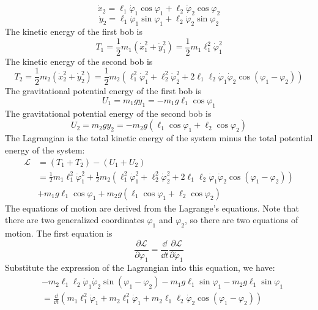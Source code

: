 \documentclass[11pt]{article}
\def\LL{{\mathcal L}}
\begin{document}
\begin{equation*}
  \dot{x}_2 = \ell_1 \dot{\varphi}_1 \cos\varphi_1 + \ell_2 \dot{\varphi}_2 \cos\varphi_2
\end{equation*}
\begin{equation*}
  \dot{y}_2 = \ell_1 \dot{\varphi}_1 \sin \varphi_1 + \ell_2 \dot{\varphi}_2 \sin \varphi_2
\end{equation*}
The kinetic energy of the first bob is
\begin{equation}
  T_1 = \frac{1}{2}m_1 (\dot{x}_1^2 + \dot{y}_1^2) = \frac{1}{2}m_1 \ell_1^2  \dot{\varphi}_1^2
\end{equation}
The kinetic energy of the second bob is
\begin{equation}
  T_2 = \frac{1}{2}m_2 (\dot{x}_2^2 + \dot{y}_2^2) = \frac{1}{2}m_2 (\ell_1^2  \dot{\varphi}_1^2 + \ell_2^2  \dot{\varphi}_2^2 +
  2\ell_1\ell_2\dot{\varphi}_1 \dot{\varphi}_2 \cos(\varphi_1 - \varphi_2))
\end{equation}
The gravitational potential energy of the first bob is
\begin{equation}
  U_1 = m_1gy_1 = -m_1g \ell_1 \cos \varphi_1
\end{equation}
The gravitational potential energy of the second bob is
\begin{equation}
  U_2 = m_2gy_2 = -m_2g (\ell_1\cos\varphi_1 + \ell_2 \cos\varphi_2)
\end{equation}
The Lagrangian is the total kinetic energy of the system minus the total potential energy of the system:
\begin{align*}
  \LL
  &= (T_1 + T_2) - (U_1 + U_2) \\
  &= \frac{1}{2}m_1 \ell_1^2  \dot{\varphi}_1^2 +
  \frac{1}{2}m_2 (\ell_1^2  \dot{\varphi}_1^2 + \ell_2^2  \dot{\varphi}_2^2 +
  2\ell_1\ell_2\dot{\varphi}_1 \dot{\varphi}_2 \cos(\varphi_1 - \varphi_2))\\
  &+
  m_1g \ell_1 \cos \varphi_1
  +
  m_2g (\ell_1\cos\varphi_1 + \ell_2 \cos\varphi_2)
\end{align*}
The equations of motion are derived from the Lagrange's equations. Note that there are two generalized coordinates
\(\varphi_1\) and \(\varphi_2\), so there are two equations of motion. The first equation is
\begin{equation*}
  \frac{\partial \LL}{\partial \varphi_1} = \frac{\dd}{\dd t} \frac{\partial \LL}{\partial \dot{\varphi}_1}
\end{equation*}
Substitute the expression of the Lagrangian into this equation, we have:
\begin{align*}
  &-m_2\ell_1\ell_2\dot{\varphi}_1 \dot{\varphi}_2 \sin(\varphi_1 - \varphi_2) - m_1g\ell_1 \sin\varphi_1 - m_2g\ell_1 \sin\varphi_1\\
  &= \frac{\dd}{\dd t}(m_1 \ell_1^2 \dot{\varphi}_1 + m_2 \ell_1^2 \dot{\varphi}_1 + m_2 \ell_1\ell_2 \dot{\varphi}_2\cos(\varphi_1 - \varphi_2))
\end{align*}
\end{document}
